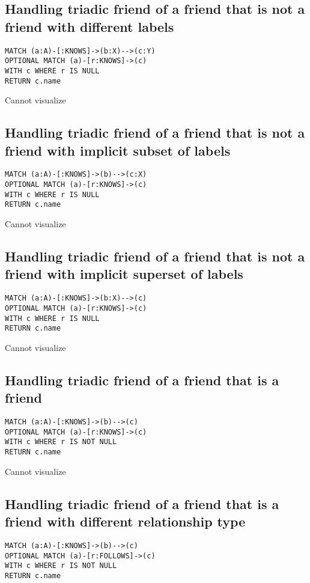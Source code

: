 \subsection{Handling triadic friend of a friend that is not a friend with different labels}

\begin{lstlisting}
MATCH (a:A)-[:KNOWS]->(b:X)-->(c:Y)
OPTIONAL MATCH (a)-[r:KNOWS]->(c)
WITH c WHERE r IS NULL
RETURN c.name
\end{lstlisting}

Cannot visualize
\subsection{Handling triadic friend of a friend that is not a friend with implicit subset of labels}

\begin{lstlisting}
MATCH (a:A)-[:KNOWS]->(b)-->(c:X)
OPTIONAL MATCH (a)-[r:KNOWS]->(c)
WITH c WHERE r IS NULL
RETURN c.name
\end{lstlisting}

Cannot visualize
\subsection{Handling triadic friend of a friend that is not a friend with implicit superset of labels}

\begin{lstlisting}
MATCH (a:A)-[:KNOWS]->(b:X)-->(c)
OPTIONAL MATCH (a)-[r:KNOWS]->(c)
WITH c WHERE r IS NULL
RETURN c.name
\end{lstlisting}

Cannot visualize
\subsection{Handling triadic friend of a friend that is a friend}

\begin{lstlisting}
MATCH (a:A)-[:KNOWS]->(b)-->(c)
OPTIONAL MATCH (a)-[r:KNOWS]->(c)
WITH c WHERE r IS NOT NULL
RETURN c.name
\end{lstlisting}

Cannot visualize
\subsection{Handling triadic friend of a friend that is a friend with different relationship type}

\begin{lstlisting}
MATCH (a:A)-[:KNOWS]->(b)-->(c)
OPTIONAL MATCH (a)-[r:FOLLOWS]->(c)
WITH c WHERE r IS NOT NULL
RETURN c.name
\end{lstlisting}

